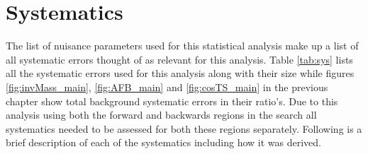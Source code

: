 \section{Systematics}
    \label{sec:sys}

    The list of nuisance parameters used for this statistical analysis make up a list of all systematic errors thought of as relevant for this analysis. Table \ref{tab:sys} lists all the systematic errors used for this analysis along with their size while figures \ref{fig:invMass_main}, \ref{fig:AFB_main} and \ref{fig:cosTS_main} in the previous chapter show total background systematic errors in their ratio's. 
    Due to this analysis using both the forward and backwards regions in the search all systematics needed to be assessed for both these regions separately.
    Following is a brief description of each of the systematics including how it was derived.

